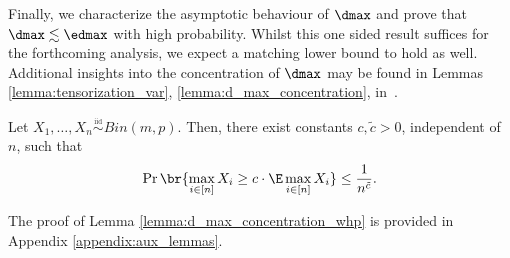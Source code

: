 Finally, we characterize the asymptotic behaviour of $\dmax$ and prove that $\dmax \lesssim \edmax$ with high probability. 
Whilst this one sided result suffices for the forthcoming analysis, we expect a matching lower bound to hold as well. Additional insights into the concentration of $\dmax$ may be found in Lemmas  \ref{lemma:tensorization_var}, \ref{lemma:d_max_concentration}, in~.
%
\begin{lemma}
\label{lemma:d_max_concentration_whp}
    Let $X_1, \ldots, X_n  \overset{\underset{\mathrm{iid}}{}}{\sim} Bin(m,p)$. Then, there exist constants $c, \tilde{c} > 0$, independent of $n$, such that 
    \[\Pr \br{\max_{i \in [n]} X_i \geq c \cdot  \E \max_{i \in [n]}X_i} \leq \frac{1}{n^{\tilde{c}}}.  \]
\end{lemma}
The proof of Lemma \ref{lemma:d_max_concentration_whp} is provided in Appendix \ref{appendix:aux_lemmas}.